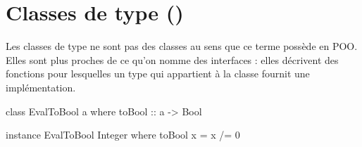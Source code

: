 \section{ Classes de type ()}
\label{sec:typeclasses}

Les classes de type ne sont pas des classes au sens que ce terme possède en POO.
Elles sont plus proches de ce qu'on nomme des interfaces : elles décrivent des fonctions
pour lesquelles un type qui appartient à la classe fournit une implémentation.

\begin{haskellcode}
class EvalToBool a where
    toBool :: a -> Bool

instance EvalToBool Integer where
    toBool x = x /= 0
\end{haskellcode}
